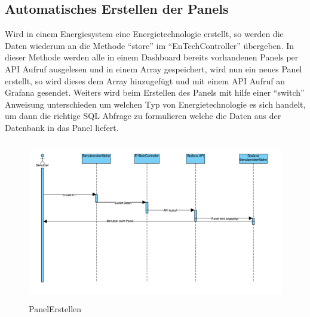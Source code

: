 \subsection{Automatisches Erstellen der Panels}
Wird in einem Energiesystem eine Energietechnologie erstellt, so werden die Daten wiederum an die Methode “store” im “EnTechController” übergeben. In dieser Methode werden alle in einem Dashboard bereits vorhandenen Panels per API Aufruf ausgelesen und in einem Array gespeichert, wird nun ein neues Panel erstellt, so wird dieses dem Array hinzugefügt und mit einem API Aufruf an Grafana gesendet. Weiters wird beim Erstellen des Panels mit hilfe einer “switch” Anweisung unterschieden um welchen Typ von Energietechnologie es sich handelt, um dann die richtige SQL Abfrage zu formulieren welche die Daten aus der Datenbank in das Panel liefert. 
\begin{figure}[h]
	\centering
	\includegraphics[height=7cm,width=14cm]{images/PanelErstellen}
	\caption{PanelErstellen}
	\label{fig:PanelErstellen }
\end{figure} 


